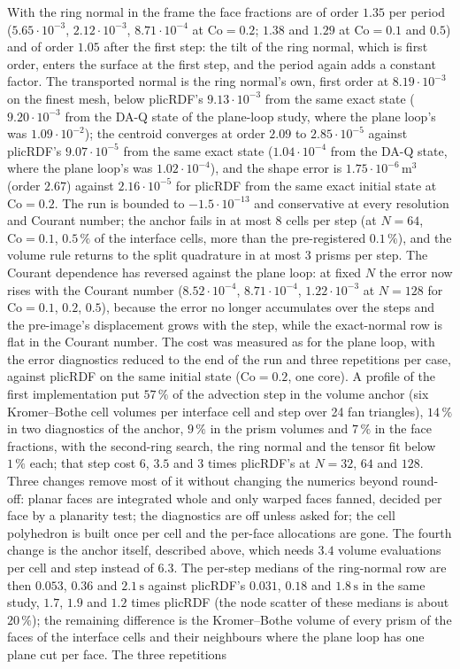 \documentclass[preprint,12pt]{elsarticle}
\begin{document}
With the ring normal in the frame the face fractions are of order $1.35$ per period ($5.65\cdot10^{-3}$, $2.12\cdot10^{-3}$, $8.71\cdot10^{-4}$ at $\mathrm{Co} = 0.2$; $1.38$ and $1.29$ at $\mathrm{Co} = 0.1$ and $0.5$) and of order $1.05$ after the first step: the tilt of the ring normal, which is first order, enters the surface at the first step, and the period again adds a constant factor. The transported normal is the ring normal's own, first order at $8.19\cdot10^{-3}$ on the finest mesh, below plicRDF's $9.13\cdot10^{-3}$ from the same exact state ($9.20\cdot10^{-3}$ from the DA-Q state of the plane-loop study, where the plane loop's was $1.09\cdot10^{-2}$); the centroid converges at order $2.09$ to $2.85\cdot10^{-5}$ against plicRDF's $9.07\cdot10^{-5}$ from the same exact state ($1.04\cdot10^{-4}$ from the DA-Q state, where the plane loop's was $1.02\cdot10^{-4}$), and the shape error is $1.75\cdot10^{-6}\,\mathrm{m^3}$ (order $2.67$) against $2.16\cdot10^{-5}$ for plicRDF from the same exact initial state at $\mathrm{Co} = 0.2$. The run is bounded to $-1.5\cdot10^{-13}$ and conservative at every resolution and Courant number; the anchor fails in at most 8 cells per step (at $N = 64$, $\mathrm{Co} = 0.1$, $0.5\,\%$ of the interface cells, more than the pre-registered $0.1\,\%$), and the volume rule returns to the split quadrature in at most 3 prisms per step. The Courant dependence has reversed against the plane loop: at fixed $N$ the error now rises with the Courant number ($8.52\cdot10^{-4}$, $8.71\cdot10^{-4}$, $1.22\cdot10^{-3}$ at $N = 128$ for $\mathrm{Co} = 0.1$, $0.2$, $0.5$), because the error no longer accumulates over the steps and the pre-image's displacement grows with the step, while the exact-normal row is flat in the Courant number. The cost was measured as for the plane loop, with the error diagnostics reduced to the end of the run and three repetitions per case, against plicRDF on the same initial state ($\mathrm{Co} = 0.2$, one core). A profile of the first implementation put $57\,\%$ of the advection step in the volume anchor (six Kromer--Bothe cell volumes per interface cell and step over 24 fan triangles), $14\,\%$ in two diagnostics of the anchor, $9\,\%$ in the prism volumes and $7\,\%$ in the face fractions, with the second-ring search, the ring normal and the tensor fit below $1\,\%$ each; that step cost $6$, $3.5$ and $3$ times plicRDF's at $N = 32$, $64$ and $128$. Three changes remove most of it without changing the numerics beyond round-off: planar faces are integrated whole and only warped faces fanned, decided per face by a planarity test; the diagnostics are off unless asked for; the cell polyhedron is built once per cell and the per-face allocations are gone. The fourth change is the anchor itself, described above, which needs $3.4$ volume evaluations per cell and step instead of $6.3$. The per-step medians of the ring-normal row are then $0.053$, $0.36$ and $2.1\,\mathrm{s}$ against plicRDF's $0.031$, $0.18$ and $1.8\,\mathrm{s}$ in the same study, $1.7$, $1.9$ and $1.2$ times plicRDF (the node scatter of these medians is about $20\,\%$); the remaining difference is the Kromer--Bothe volume of every prism of the faces of the interface cells and their neighbours where the plane loop has one plane cut per face. The three repetitions 
\end{document}
